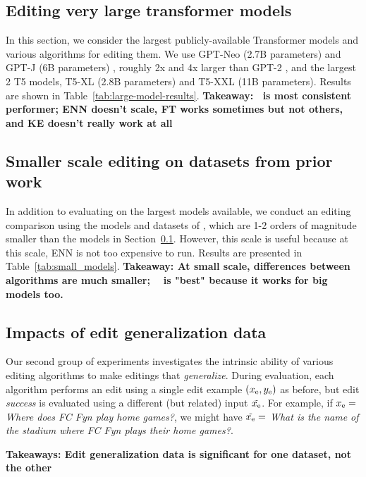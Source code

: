 \documentclass{article}
\begin{document}
\subsection{Editing very large transformer models}
\label{sec:large-models}
In this section, we consider the largest publicly-available Transformer models and various algorithms for editing them. We use GPT-Neo (2.7B parameters) \citep{gpt-neo} and GPT-J (6B parameters) \citep{gpt-j}, roughly 2x and 4x larger than GPT-2 \citep{radford2019language}, and the largest 2 T5 models, T5-XL (2.8B parameters) and T5-XXL (11B parameters). Results are shown in Table~\ref{tab:large-model-results}.
\textbf{Takeaway: \name~is most consistent performer; ENN doesn't scale, FT works sometimes but not others, and KE doesn't really work at all}

\subsection{Smaller scale editing on datasets from prior work}

In addition to evaluating on the largest models available, we conduct an editing comparison using the models and datasets of \cite{Cao2021EditingFK}, which are 1-2 orders of magnitude smaller than the models in Section~\ref{sec:large-models}. However, this scale is useful because at this scale, ENN is not too expensive to run. Results are presented in Table~\ref{tab:small_models}. \textbf{Takeaway: At small scale, differences between algorithms are much smaller; \name~ is "best" because it works for big models too.}



\subsection{Impacts of edit generalization data}
Our second group of experiments investigates the intrinsic ability of various editing algorithms to make editings that \textit{generalize}. During evaluation, each algorithm performs an edit using a single edit example $(x_\text{e}, y_\text{e})$ as before, but edit \textit{success} is evaluated using a different (but related) input $\tilde {x_\text{e}}$. For example, if $x_\text{e}=$ \textit{Where does FC Fyn play home games?}, we might have $\tilde {x_\text{e}}=$ \textit{What is the name of the stadium where FC Fyn plays their home games?}.

\textbf{Takeaways: Edit generalization data is significant for one dataset, not the other}
\end{document}
